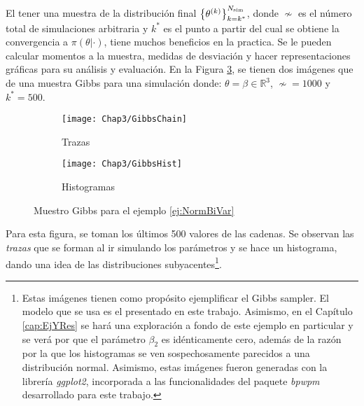 \documentclass[../Main/Main.tex]{subfiles}
\begin{document}
El tener una muestra de la distribución final $\left\{\theta^{(k)}\right\}_{k=k^*}^{N_{\text{sim}}}$, donde $\nsim$ es el número total de simulaciones arbitraria y $k^*$ es el punto a partir del cual se obtiene la convergencia a $\pi(\theta|\cdot)$, tiene muchos beneficios en la practica. Se le pueden calcular momentos a la muestra, medidas de desviación y hacer representaciones gráficas para su análisis y evaluación. En la Figura \ref{fig:GibbsSamplerSimulado}, se tienen dos imágenes que de una muestra Gibbs para una simulación donde: $\theta = \beta \in \mathbb{R}^3$, $\nsim = 1000$ y $k^* = 500$. 
\begin{figure}[h]
    \centering
    \begin{subfigure}[b]{0.45\textwidth}
        \texttt{[image: Chap3/GibbsChain]}
        \caption{Trazas}
        \label{fig:GibbsChain}
    \end{subfigure}
	\quad
    \begin{subfigure}[b]{0.45\textwidth}
        \texttt{[image: Chap3/GibbsHist]}
        \caption{Histogramas}
        \label{fig:GibbsHist}
    \end{subfigure}
    \caption{Muestro Gibbs para el ejemplo \ref{ej:NormBiVar}}\label{fig:GibbsSamplerSimulado}
\end{figure}
Para esta figura, se toman los últimos 500 valores de las cadenas. Se observan las \textit{trazas} que se forman al ir simulando los parámetros y se hace un histograma, dando una idea de las distribuciones subyacentes\footnote{Estas imágenes tienen como propósito ejemplificar el Gibbs sampler. El modelo que se usa es el presentado en este trabajo. Asimismo, en el Capítulo \ref{cap:EjYRes} se hará una exploración a fondo de este ejemplo en particular y se verá por que el parámetro $\beta_2$ es idénticamente cero, además de la razón por la que los histogramas se ven sospechosamente parecidos a una distribución normal. Asimismo, estas imágenes fueron generadas con la librería \textit{ggplot2}, incorporada a las funcionalidades del paquete \textit{bpwpm} desarrollado para este trabajo.}.\\
\end{document}
